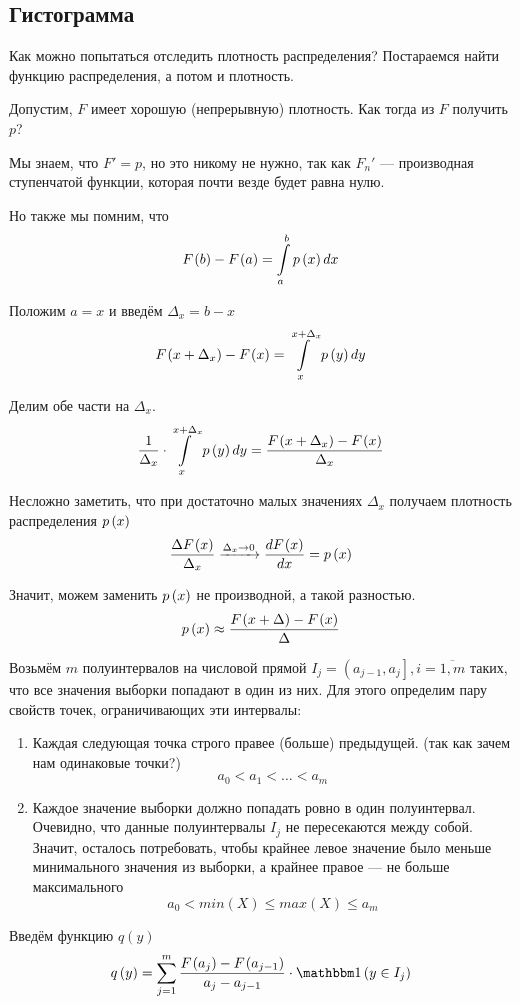 \subsection{Гистограмма}
Как можно попытаться отследить плотность распределения?
Постараемся найти функцию распределения, а потом и плотность.

Допустим, $F$ имеет хорошую (непрерывную) плотность.
Как тогда из $F$ получить $p$?

Мы знаем, что $F'=p$, но это никому не нужно, так как $F_n'$ --- производная
ступенчатой функции, которая почти везде будет равна нулю.

Но также мы помним, что
$$F_{}\left(b\right)-F_{}\left(a\right)=\int\limits_a^b p\left(x\right) dx$$

Положим $a=x$ и введём $\Delta_x=b-x$
$$F_{}\left(x+\Delta_x\right)-F_{}\left(x\right)=\int\limits_x^{x+\Delta_x} p\left(y\right) dy$$

Делим обе части на $\Delta_x$.
$$\frac{1}{\Delta_x}\cdot\int\limits_x^{x+\Delta_x} p\left(y\right) dy
=\frac{F_{}\left(x+\Delta_x\right)-F_{}\left(x\right)}{\Delta_x}$$

Несложно заметить,
что при достаточно малых значениях $\Delta_x$
получаем плотность распределения $p\left(x\right)$
$$\frac{\Delta F_{}\left(x\right)}{\Delta_x}
\xrightarrow[]{\Delta_x\to 0}
\frac{dF_{}\left(x\right)}{dx}=p\left(x\right)$$

Значит, можем заменить $p\left(x\right)$ не производной, а такой разностью.
$$p\left(x\right)\approx\frac{F_{}\left(x+\Delta\right)-F_{}\left(x\right)}{\Delta}$$

Возьмём $m$ полуинтервалов на числовой прямой
$I_j=\left(a_{j-1},a_j\right], i=\overline{1,m}$
таких, что все значения выборки попадают в один из них.
Для этого определим пару свойств точек, ограничивающих эти интервалы:
\begin{enumerate}
    \item Каждая следующая точка строго правее (больше) предыдущей.
        (так как зачем нам одинаковые точки?)
        $$a_0<a_1<\dots<a_m$$
    \item Каждое значение выборки должно попадать ровно в один полуинтервал.
        Очевидно, что данные полуинтервалы $I_j$ не пересекаются между собой.
        Значит, осталось потребовать, чтобы
        крайнее левое значение было меньше минимального значения из выборки,
        а крайнее правое --- не больше максимального
        $$a_0<min\left(X\right)\le max\left(X\right)\le a_m$$
\end{enumerate}

Введём функцию $q\left(y\right)$
$$q\left(y\right)
=\sum_{j=1}^m \frac{\cdf{a_j}-\cdf{a_{j-1}}}{a_j-a_{j-1}}
    \cdot\indicator{y\in I_j}$$

